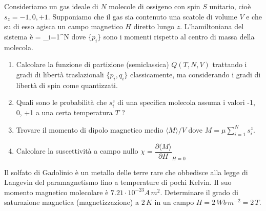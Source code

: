 \begin{Exercise}[title={Ossigeno molecolare con spin 1},label={ex:05-ossigenomol}]
	Consideriamo  un gas ideale di $N$  molecole di ossigeno con spin $S$ unitario, cioè $s_z =-1, 0, +1 $. Supponiamo che il gas sia contenuto una scatole di volume $V$ e che su di esso agisca un campo magnetico $H$ diretto lungo $z$. L'hamiltoniana del sistema è
  \be
   = \sum_{i=1}^{N}
  \ee
  dove $\{p_i \}$ sono i momenti rispetto al centro di massa della molecola.
  \begin{enumerate}
    \item Calcolare la funzione di partizione (semiclassica) $Q(T,N,V)$ trattando i gradi di libertà traslazionali $\{p_i , q_i \}$ classicamente, ma considerando i gradi di libertà di spin come quantizzati.
    \item Quali sono le probabilità che $s_i^z$  di una specifica molecola assuma i valori -1, 0, +1 a una certa temperatura $T$ ?
    \item Trovare il momento di dipolo magnetico medio $\langle M \rangle / V$ dove $M = \mu\sum_{i=1}^{N}s_i^z.$
    \item Calcolare la suscettività a campo nullo $\chi =\dfrac{\partial \langle M \rangle}{\partial H}_{H=0} $
  \end{enumerate}
\end{Exercise}


\begin{Exercise}[title={Gadolinio},label={ex:06-gadolinio}]
	Il solfato di Gadolinio è un metallo delle terre rare che  obbedisce alla legge di Langevin del paramagnetismo fino a temperature di pochi Kelvin. Il suo momento magnetico molecolare è $7.21\cdot 10^{-23} A\,m^2$. Determinare il grado di saturazione magnetica (magnetizzazione) a $2\,K$ in un campo $H = 2\, Wb\,m^{-2} = 2\, T$.
\end{Exercise}


